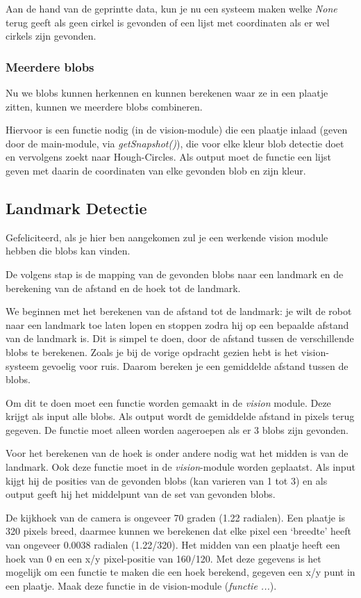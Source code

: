 \documentclass[a4paper]{article}
\begin{document}
Aan de hand van de geprintte data, kun je nu een systeem maken welke \textit{None} terug geeft als geen cirkel is gevonden of een lijst met coordinaten als er wel cirkels zijn gevonden.

\subsubsection{Meerdere blobs}
Nu we blobs kunnen herkennen en kunnen berekenen waar ze in een plaatje zitten, kunnen we meerdere blobs combineren.

Hiervoor is een functie nodig (in de vision-module) die een plaatje inlaad (geven door de main-module, via \textit{getSnapshot()}), die voor elke kleur blob detectie doet en vervolgens zoekt  naar Hough-Circles. Als output moet de functie een lijst geven met daarin de coordinaten van elke gevonden blob en zijn kleur.

\subsection{Landmark Detectie}
Gefeliciteerd, als je hier ben aangekomen zul je een werkende vision module hebben die blobs kan vinden.

De volgens stap is de mapping van de gevonden blobs naar een landmark en de berekening van de afstand en de hoek tot de landmark.

We beginnen met het berekenen van de afstand tot de landmark: je wilt de robot naar een landmark toe laten lopen en stoppen zodra hij op een bepaalde afstand van de landmark is. Dit is simpel te doen, door de afstand tussen de verschillende blobs te berekenen. Zoals je bij de vorige opdracht gezien hebt is het vision-systeem gevoelig voor ruis. Daarom bereken je een gemiddelde afstand tussen de blobs. 

Om dit te doen moet een functie worden gemaakt in de \textit{vision} module. Deze krijgt als input alle blobs. Als output wordt de gemiddelde afstand in pixels terug gegeven. De functie moet alleen worden aageroepen als er 3 blobs zijn gevonden.

Voor het berekenen van de hoek is onder andere nodig wat het midden is van de landmark. Ook deze functie moet in de \textit{vision}-module worden geplaatst. Als input kijgt hij de posities van de gevonden blobs (kan varieren van 1 tot 3) en als output geeft hij het middelpunt van de set van gevonden blobs. 

De kijkhoek van de camera is ongeveer 70 graden (1.22 radialen). Een plaatje is 320 pixels breed, daarmee kunnen we berekenen dat elke pixel een `breedte' heeft van ongeveer 0.0038 radialen (1.22/320). Het midden van een plaatje heeft een hoek van 0 en een x/y pixel-positie van 160/120. Met deze gegevens is het mogelijk om een functie te maken die een hoek berekend, gegeven een x/y punt in een plaatje. Maak deze functie in de vision-module (\textit{functie ...}).
\end{document}

